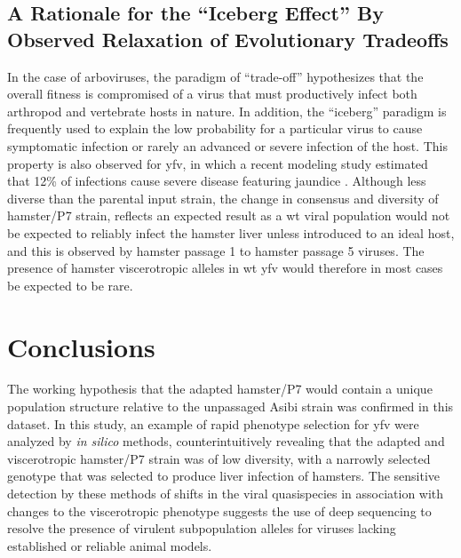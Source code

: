 \subsection{A Rationale for the ``Iceberg Effect'' By Observed Relaxation of Evolutionary Tradeoffs}
In the case of arboviruses, the paradigm of “trade-off” hypothesizes that the overall fitness is compromised of a virus that must productively infect both arthropod and vertebrate hosts in nature. In addition, the “iceberg” paradigm is frequently used to explain the low probability for a particular virus to cause symptomatic infection  or rarely an advanced or severe infection of the host. This property is also observed for \gls{yfv}, in which a recent modeling study estimated that 12\% of infections cause severe disease featuring jaundice \parencite{Johansson:2014hv}. Although less diverse than the parental input strain, the change in consensus and diversity of hamster/P7 strain, reflects an expected result as a \gls{wt} viral population would not be expected to reliably infect the hamster liver unless introduced to an ideal host, and this is observed by hamster passage 1 to hamster passage 5 viruses. The presence of hamster viscerotropic alleles in \gls{wt} \gls{yfv} would therefore in most cases be expected to be rare. 
\section{Conclusions}
The working hypothesis that the adapted hamster/P7 would contain a unique population structure relative to the unpassaged Asibi strain was confirmed in this dataset. In this study, an example of rapid phenotype selection for \gls{yfv} were analyzed by \emph{in silico} methods, counterintuitively revealing that the adapted and viscerotropic hamster/P7 strain was of low diversity, with a narrowly selected genotype that was selected to produce liver infection of hamsters. The sensitive detection by these methods of shifts in the viral quasispecies in association with changes to the viscerotropic phenotype suggests the use of deep sequencing to resolve the presence of virulent subpopulation alleles for viruses lacking established or reliable animal models.
\clearpage

